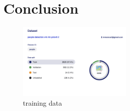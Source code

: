 \section{Conclusion}
\label{sec:conclusion}

\begin{figure}[h]
    \centering
    \includegraphics[width=0.5\textwidth]{images/train.png}
    \caption{training data}
    \label{fig:data}
\end{figure}


